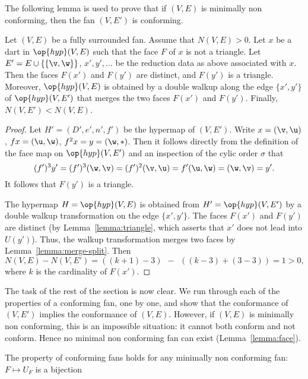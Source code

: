 The following lemma is used to prove that if $(V,E)$ is minimally non conforming,
then the fan $(V,E')$ is conforming.

\begin{lemma}[]\label{lemma:lessN}
  Let $(V,E)$ be a fully surrounded fan.  Assume that $N(V,E)>0$.  Let
  $x$ be a dart in $\op{hyp}(V,E)$ such that the face $F$ of $x$ is
  not a triangle.  Let $E'=E\cup \{\{\v,\w\}\}$, $x',y',\ldots$ be the reduction data
  as above associated with $x$.  Then the faces $F(x')$ and $F(y')$ are distinct, and
  $F(y')$ is a
  triangle. Moreover, $\op{hyp}(V,E)$ is obtained by a double walkup along the
  edge $\{x',y'\}$ of $\op{hyp}(V,E')$ that merges the two faces $F(x')$ and $F(y')$.
  Finally, $N(V,E')<N(V,E)$.
\end{lemma}


\begin{proof} Let $H'=(D',e',n',f')$ be the hypermap of $(V,E')$.
Write $x = (\v,\u)$, $f x = (\u,\w)$, $f^2 x = y = (\w,*)$.
Then it follows directly from the definition of the face map on $\op{hyp}(V,E')$
and an inspection of the cylic order $\sigma$ that
\begin{displaymath}
(f')^3 y' = (f')^3 (\w,\v) = (f')^2(\v,\u) = f' (\u,\w) = (\w,\v) = y'.
\end{displaymath}
It follows that $F(y')$ is a triangle.

The hypermap $H=\op{hyp}(V,E)$ is obtained from
$H'=\op{hyp}(V,E')$ by a double walkup transformation on the edge
$\{x',y'\}$.  The faces $F(x')$ and $F(y')$ are distinct (by
Lemma~\ref{lemma:triangle}, which asserts that $x'$ does not lead
into $U(y')$).  Thus, the walkup transformation merges two faces by Lemma~\ref{lemma:merge-split}.
Then
\begin{displaymath}N(V,E) - N(V,E') = ((k+1)-3) ~~-~~ ((k-3) +
(3-3)) = 1 >0,\end{displaymath} where $k$ is the cardinality of
$F(x')$.
\end{proof}

The task of the rest of the section is now clear.  We run through each
of the properties of a conforming fan, one by one, and show that the
conformance of $(V,E')$ implies the conformance of $(V,E)$.  However,
if $(V,E)$ is minimally non conforming, this is an impossible
situation: it cannot both conform and not conform.  Hence no minimal
non conforming fan can exist (Lemma~\ref{lemma:face}).

\begin{lemma}[bijection]
The property  of conforming fans holds for any
minimally non conforming fan: $F\mapsto U_F$ is a bijection
\end{lemma}

